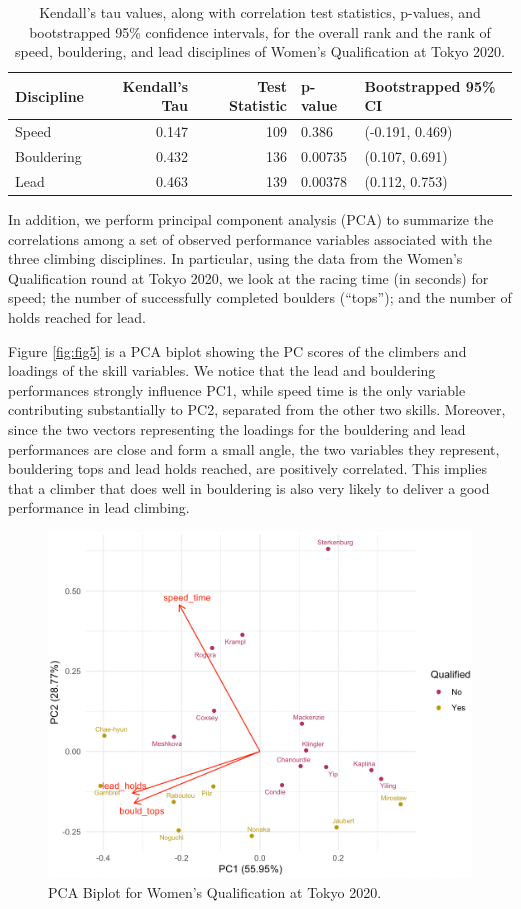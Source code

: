 \documentclass[letterpaper, inpress]{jds} %
\begin{document}
\begin{table}[tbp]
  \caption{Kendall's tau values, along with correlation
test statistics, p-values, and bootstrapped 95\% confidence intervals,
for the overall rank and the rank of speed, bouldering, and lead
disciplines of Women's Qualification at Tokyo 2020.}%
  \label{tab:tab1}
  \centering
  \begin{tabular}[]{@{}lrrll@{}}
\toprule
Discipline & Kendall's Tau & Test Statistic & p-value & Bootstrapped
95\% CI \\
\midrule
Speed & 0.147 & 109 & 0.386 & (-0.191, 0.469) \\
Bouldering & 0.432 & 136 & 0.00735 & (0.107, 0.691) \\
Lead & 0.463 & 139 & 0.00378 & (0.112, 0.753) \\
\bottomrule
  \end{tabular}
\end{table}

In addition, we perform principal component analysis (PCA) to summarize
the correlations among a set of observed performance variables
associated with the three climbing disciplines. In particular, using the
data from the Women's Qualification round at Tokyo 2020, we look at the
racing time (in seconds) for speed; the number of successfully completed
boulders (``tops''); and the number of holds reached for lead.

Figure \ref{fig:fig5} is a PCA biplot showing the PC scores of the
climbers and loadings of the skill variables. We notice that the lead
and bouldering performances strongly influence PC1, while speed time is
the only variable contributing substantially to PC2, separated from the
other two skills. Moreover, since the two vectors representing the
loadings for the bouldering and lead performances are close and form a
small angle, the two variables they represent, bouldering tops and lead
holds reached, are positively correlated. This implies that a climber
that does well in bouldering is also very likely to deliver a good
performance in lead climbing.

\begin{figure}

{\centering \includegraphics[width=0.7\linewidth]{pca} 

}

\caption{\label{fig:fig5}PCA Biplot for Women's Qualification at Tokyo 2020.}\label{fig:pca}
\end{figure}
\end{document}
